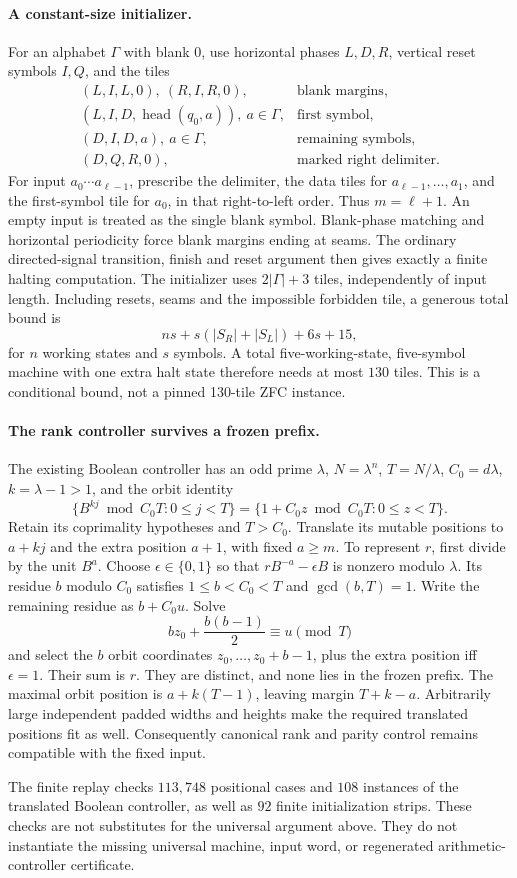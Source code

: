 \paragraph{A constant-size initializer.}
For an alphabet $\Gamma$ with blank $0$, use horizontal phases $L,D,R$,
vertical reset symbols $I,Q$, and the tiles
\[
\begin{array}{ll}
(L,I,L,0),\ (R,I,R,0),&\text{blank margins},\\
(L,I,D,\operatorname{head}(q_0,a)),\ a\in\Gamma,
 &\text{first symbol},\\
(D,I,D,a),\ a\in\Gamma,&\text{remaining symbols},\\
(D,Q,R,0),&\text{marked right delimiter}.
\end{array}
\]
For input $a_0\cdots a_{\ell-1}$, prescribe the delimiter, the data tiles
for $a_{\ell-1},\ldots,a_1$, and the first-symbol tile for $a_0$, in that
right-to-left order. Thus $m=\ell+1$. An empty input is treated as the
single blank symbol. Blank-phase matching and horizontal periodicity force
blank margins ending at seams. The ordinary directed-signal transition,
finish and reset argument then gives exactly a finite halting computation.
The initializer uses $2|\Gamma|+3$ tiles, independently of input length.
Including resets, seams and the impossible forbidden tile, a generous total
bound is
\[
 ns+s(|S_R|+|S_L|)+6s+15,
\]
for $n$ working states and $s$ symbols. A total five-working-state,
five-symbol machine with one extra halt state therefore needs at most
$130$ tiles. This is a conditional bound, not a pinned 130-tile ZFC instance.

\paragraph{The rank controller survives a frozen prefix.}
The existing Boolean controller has an odd prime $\lambda$, $N=\lambda^n$, $T=N/\lambda$,
$C_0=d\lambda$, $k=\lambda-1>1$, and the orbit identity
\[
 \{B^{kj}\bmod C_0T:0\le j<T\}
 =\{1+C_0z\bmod C_0T:0\le z<T\}.
\]
Retain its coprimality hypotheses and $T>C_0$. Translate its mutable
positions to $a+kj$ and the extra position $a+1$, with fixed $a\ge m$.
To represent $r$, first divide by the unit $B^a$. Choose
$\epsilon\in\{0,1\}$ so that $rB^{-a}-\epsilon B$ is nonzero modulo
$\lambda$. Its residue $b$ modulo $C_0$ satisfies
$1\le b<C_0<T$ and $\gcd(b,T)=1$. Write the remaining residue as
$b+C_0u$. Solve
\[
 bz_0+\frac{b(b-1)}2\equiv u\pmod T
\]
and select the $b$ orbit coordinates $z_0,\ldots,z_0+b-1$, plus the extra
position iff $\epsilon=1$. Their sum is $r$. They are distinct, and none
lies in the frozen prefix. The maximal orbit position is $a+k(T-1)$,
leaving margin $T+k-a$. Arbitrarily large independent padded widths and
heights make the required translated positions fit as well. Consequently
canonical rank and parity control remains compatible with the fixed input.

The finite replay checks $113{,}748$ positional cases and $108$ instances
of the translated Boolean controller, as well as $92$ finite initialization strips. These checks are not substitutes for
the universal argument above. They do not instantiate the missing universal
machine, input word, or regenerated arithmetic-controller certificate.
